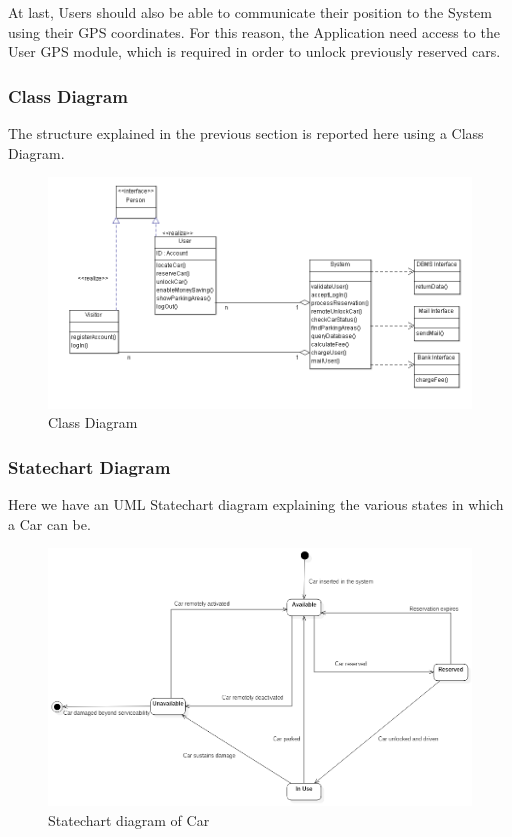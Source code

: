 At last, Users should also be able to communicate their position to the System using their GPS coordinates. For this reason, the Application need access to the User GPS module, which is required in order to unlock previously reserved cars.

\subsubsection{Class Diagram}
The structure explained in the previous section is reported here using a Class Diagram.
\begin{figure}[h]
\centering
\includegraphics[width=\linewidth,keepaspectratio]{../Diagrams/CD/Class_Diagram.png}
\caption{Class Diagram}
\end{figure}
\FloatBarrier

\subsubsection{Statechart Diagram}
Here we have an UML Statechart diagram explaining the various states in which a Car can be.
\begin{figure}[h]
\centering
\includegraphics[width=\linewidth,keepaspectratio]{../Diagrams/SCD/SCD_Car.png}
\caption{Statechart diagram of Car}
\end{figure}
\FloatBarrier

